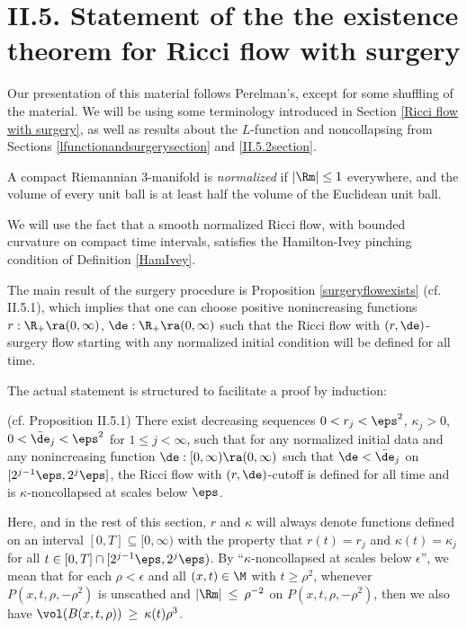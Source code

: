 \section{II.5. Statement of the
the existence theorem for
 Ricci flow with surgery} \label{II.5}

 Our presentation of this material follows Perelman's, except for
some shuffling of the material.  We will be using some terminology
introduced in Section \ref{Ricci flow with surgery}, as well
as results about the $L$-function and noncollapsing from
Sections \ref{lfunctionandsurgerysection} and \ref{II.5.2section}.

\begin{definition}
  \label{def:kl-statement-existence-theorem-ricci-flow-surgery-normalized-definition}

A compact Riemannian $3$-manifold is {\em normalized} if
$|\Rm|\leq 1$ everywhere, and the volume of every unit
ball is at least half the volume of the Euclidean unit
ball.
\end{definition}

We will use the fact that a smooth normalized
Ricci flow, with bounded curvature on compact time intervals,
satisfies the Hamilton-Ivey pinching condition of
Definition \ref{HamIvey}.

The main result of the surgery procedure is Proposition \ref{surgeryflowexists}
(cf. II.5.1), which
implies that one can choose positive nonincreasing
functions $r:\R_+\ra (0,\infty)$,
$\de:\R_+\ra (0,\infty)$ such that the Ricci
flow with $(r,\de)$-surgery
flow starting with any normalized initial condition will be defined
for all time.

The actual statement is structured to facilitate
a proof by induction:


\begin{proposition}
  \label{prop:kl-statement-existence-theorem-ricci-flow-surgery-monotonicity-kappa-solutions}
(cf. Proposition II.5.1)
\label{surgeryflowexists}
There exist decreasing sequences $0<r_j<\eps^2$,
$\kappa_j>0$, $0<\bar\de_j<\eps^2$ for $1\leq j<\infty$,
such that for any normalized initial data and any nonincreasing function
$\de:[0,\infty)\ra(0,\infty)$ such that $\de<\bar\de_j$
on $[2^{j-1}\eps,2^j\eps]$, the Ricci flow with $(r,\de)$-cutoff
is defined for all time and is $\kappa$-noncollapsed
at scales below $\eps$.
\end{proposition}
\noindent
Here, and in the rest of this section, $r$ and $\kappa$
will always denote functions defined on an interval
$[0,T]\subseteq [0,\infty)$ with the property that
$r(t)=r_j$ and $\kappa(t)=\kappa_j$
for all $t\in [0,T]\cap [2^{j-1}\eps,2^j\eps)$.
By ``$\kappa$-noncollapsed at scales below $\epsilon$'', we mean
that for each $\rho < \epsilon$
and all $(x, t) \in \M$
with $t \ge \rho^2$,
whenever $P(x, t, \rho, - \rho^2)$ is unscathed and
$|\Rm| \: \le \: \rho^{-2}$ on $P(x, t, \rho, - \rho^2)$,
then we also have
$\vol(B(x,t,\rho)) \: \ge \: \kappa(t) \rho^3$.

